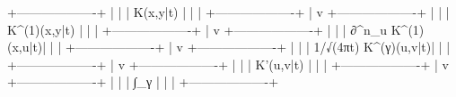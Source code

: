+-------------------+
  |                   |
  |   K(x,y|t)        |
  |                   |
  +-------------------+
       |
       v
  +-------------------+
  |                   |
  | K^(1)(x,y|t)      |
  |                   |
  +-------------------+
       |
       v
  +-------------------+
  |                   |
  | ∂^n_u K^(1)(x,u|t)|
  |                   |
  +-------------------+
       |
       v
  +-------------------+
  |                   |
  | 1/√(4πt) K^(γ)(u,v|t)|
  |                   |
  +-------------------+
       |
       v
  +-------------------+
  |                   |
  | K'(u,v|t)         |
  |                   |
  +-------------------+
       |
       v
  +-------------------+
  |                   |
  | ∫_γ                 |
  |                   |
  +-------------------+